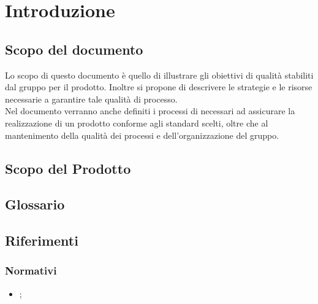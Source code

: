 \section{Introduzione}

\subsection{Scopo del documento}
Lo scopo di questo documento è quello di illustrare gli obiettivi di qualità stabiliti dal gruppo \GroupName{} per il prodotto. Inoltre si propone di descrivere le strategie e le risorse necessarie a garantire tale qualità di processo.\\
Nel documento verranno anche definiti i processi di \VV{} necessari ad assicurare la realizzazione di un prodotto conforme agli standard scelti, oltre che al mantenimento della qualità dei processi e dell'organizzazione del gruppo.

\subsection{Scopo del Prodotto}
\ScopoDelProdotto{}

\subsection{Glossario}
\GlossarioIntroduzione{}

\subsection{Riferimenti}
\subsubsection{Normativi}
\begin{itemize}
	\item \textbf{\NormeDiProgetto{}};
\end{itemize}

